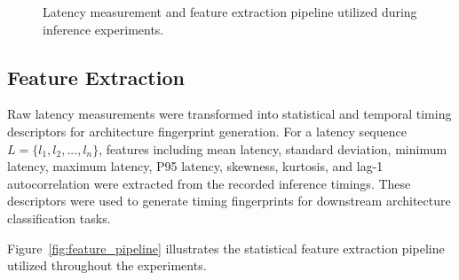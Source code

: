 \documentclass[conference]{IEEEtran}
\begin{document}
\begin{figure}[t]
\centering
{}
\caption{Latency measurement and feature extraction pipeline utilized during inference experiments.}
\label{fig:latency_pipeline}
\end{figure}

\subsection{Feature Extraction}

Raw latency measurements were transformed into statistical and temporal timing descriptors for architecture fingerprint generation. For a latency sequence \(L = \{l_1, l_2, ..., l_n\}\), features including mean latency, standard deviation, minimum latency, maximum latency, P95 latency, skewness, kurtosis, and lag-1 autocorrelation were extracted from the recorded inference timings. These descriptors were used to generate timing fingerprints for downstream architecture classification tasks.

Figure~\ref{fig:feature_pipeline} illustrates the statistical feature extraction pipeline utilized throughout the experiments.
\end{document}
